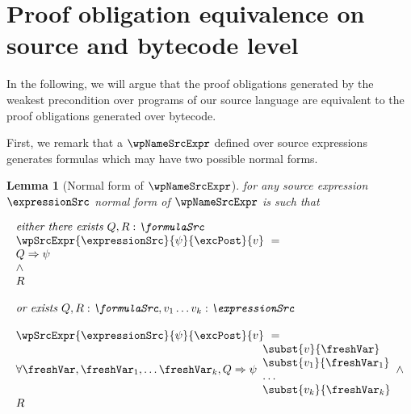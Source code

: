 

\newtheorem{wpExprSrc}{Lemma}[section]
\newtheorem{exprValueOnStack1}[wpExprSrc]{Lemma}
\newtheorem{exprSrcBcWp1}[wpExprSrc]{Lemma}
\newtheorem{exprSrcBcWp2}[wpExprSrc]{Lemma}
\newtheorem{wpStmtBcSrc1}[wpExprSrc]{Lemma}
\newtheorem{wpStmtBcSrc3}[wpExprSrc]{Lemma} %
\newtheorem{wpStmtBcSrc2}[wpExprSrc]{Lemma}
\newtheorem{theorem}{Theorem}[section]


\section{Proof obligation equivalence on source and bytecode level}\label{pogEq:aux}

In the following, we will argue that the proof obligations generated by the weakest precondition
over programs of our source language are equivalent to the  proof obligations generated over bytecode.

First, we remark that a $\wpNameSrcExpr$ defined over source  expressions generates formulas which may
 have two possible normal forms.


\begin{wpExprSrc}[Normal form of $\wpNameSrcExpr$] \label{pogEq:aux:wpExprSrc}
for any source expression $\expressionSrc$ 
normal form of  $\wpNameSrcExpr$ is such that 

$$ \begin{array}{l}
         \mbox{\rm\textit{either  there exists $ Q,R:\formulaSrc $  }} \\
         \wpSrcExpr{\expressionSrc }{ \psi }{ \excPost}{v} \  = \\ 
          Q \Rightarrow \psi \\
          \wedge \\ 
	  R \\\\
	  \mbox{\rm\textit{or exists $ Q,R:\formulaSrc, v_1 \ldots v_k :\expressionSrc $   }} \\
\\
 \wpSrcExpr{\expressionSrc }{ \psi }{ \excPost}{v} \  = \\
      \forall \freshVar, \freshVar_1, \ldots  \freshVar_k   ,  Q \Rightarrow \psi 
                                                                             \begin{array}{l}
									         \subst{v}{ \freshVar}  \\
									        \subst{v_1 }{ \freshVar_1 }  \\
										\ldots \\
										\subst{v_k}{ \freshVar_k } 
									     \end{array}
          \wedge \\ 
	  R  
   \end{array}  $$ \\
\end{wpExprSrc}

